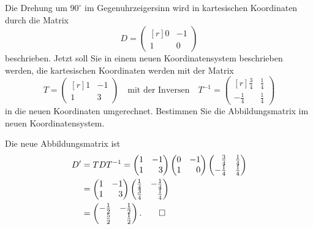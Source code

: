 Die Drehung um $90^\circ$ im Gegenuhrzeigersinn wird in kartesischen
Koordinaten durch die Matrix
\[
D
=
\begin{pmatrix*}[r]
0&-1\\
1& 0
\end{pmatrix*}
\]
beschrieben.
Jetzt soll Sie in einem neuen Koordinatensystem beschrieben werden,
die kartesischen Koordinaten werden mit der Matrix
\[
\renewcommand{\arraystretch}{1.2}
T
=
\begin{pmatrix*}[r]
1&-1\\
1& 3
\end{pmatrix*}
\quad\text{mit der Inversen}\quad
T^{-1}
=
\begin{pmatrix*}[r]
 \frac34&\frac14\\
-\frac14&\frac14
\end{pmatrix*}
\]
in die neuen Koordinaten umgerechnet.
Bestimmen Sie die Abbildungsmatrix im neuen Koordinatensystem.

\begin{loesung}
Die neue Abbildungsmatrix ist
\renewcommand{\arraystretch}{1.2}
\begin{align*}
D'
&=
TDT^{-1}
=
\begin{pmatrix*}[r]
1&-1\\
1& 3
\end{pmatrix*}
\begin{pmatrix*}[r]
0&-1\\
1& 0
\end{pmatrix*}
\begin{pmatrix*}[r]
 \frac34&\frac14\\
-\frac14&\frac14
\end{pmatrix*}
\\
&=
\begin{pmatrix*}[r]
1&-1\\
1& 3
\end{pmatrix*}
\begin{pmatrix*}[r]
\frac14&-\frac14\\
\frac34& \frac14
\end{pmatrix*}
\\
&=
\begin{pmatrix*}[r]
-\frac12&-\frac12\\
\frac52&\frac12
\end{pmatrix*}.
\qedhere
\end{align*}
\end{loesung}
